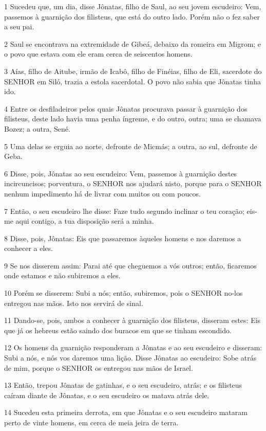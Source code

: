 \par 1 Sucedeu que, um dia, disse Jônatas, filho de Saul, ao seu jovem escudeiro: Vem, passemos à guarnição dos filisteus, que está do outro lado. Porém não o fez saber a seu pai.
\par 2 Saul se encontrava na extremidade de Gibeá, debaixo da romeira em Migrom; e o povo que estava com ele eram cerca de seiscentos homens.
\par 3 Aías, filho de Aitube, irmão de Icabô, filho de Finéias, filho de Eli, sacerdote do SENHOR em Siló, trazia a estola sacerdotal. O povo não sabia que Jônatas tinha ido.
\par 4 Entre os desfiladeiros pelos quais Jônatas procurava passar à guarnição dos filisteus, deste lado havia uma penha íngreme, e do outro, outra; uma se chamava Bozez; a outra, Sené.
\par 5 Uma delas se erguia ao norte, defronte de Micmás; a outra, ao sul, defronte de Geba.
\par 6 Disse, pois, Jônatas ao seu escudeiro: Vem, passemos à guarnição destes incircuncisos; porventura, o SENHOR nos ajudará nisto, porque para o SENHOR nenhum impedimento há de livrar com muitos ou com poucos.
\par 7 Então, o seu escudeiro lhe disse: Faze tudo segundo inclinar o teu coração; eis-me aqui contigo, a tua disposição será a minha.
\par 8 Disse, pois, Jônatas: Eis que passaremos àqueles homens e nos daremos a conhecer a eles.
\par 9 Se nos disserem assim: Parai até que cheguemos a vós outros; então, ficaremos onde estamos e não subiremos a eles.
\par 10 Porém se disserem: Subi a nós; então, subiremos, pois o SENHOR no-los entregou nas mãos. Isto nos servirá de sinal.
\par 11 Dando-se, pois, ambos a conhecer à guarnição dos filisteus, disseram estes: Eis que já os hebreus estão saindo dos buracos em que se tinham escondido.
\par 12 Os homens da guarnição responderam a Jônatas e ao seu escudeiro e disseram: Subi a nós, e nós vos daremos uma lição. Disse Jônatas ao escudeiro: Sobe atrás de mim, porque o SENHOR os entregou nas mãos de Israel.
\par 13 Então, trepou Jônatas de gatinhas, e o seu escudeiro, atrás; e os filisteus caíram diante de Jônatas, e o seu escudeiro os matava atrás dele.
\par 14 Sucedeu esta primeira derrota, em que Jônatas e o seu escudeiro mataram perto de vinte homens, em cerca de meia jeira de terra.
